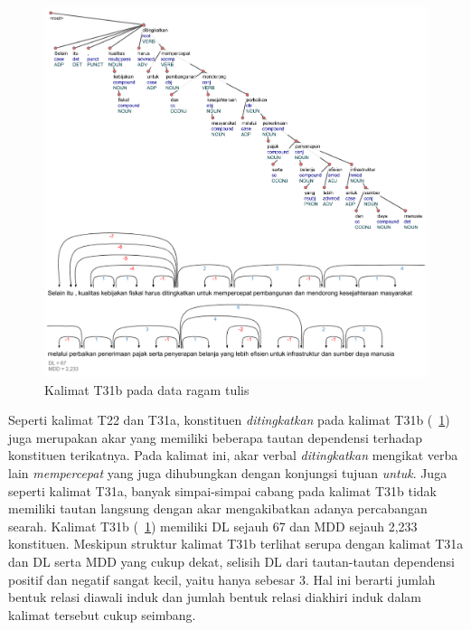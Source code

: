 \begin{figure}
	\centering \includegraphics[width=1
	\textwidth] {pics/ts2081.jpg} 
	\caption{Kalimat T31b pada data ragam tulis} 
	\label{fig:ts2081} 
\end{figure}

Seperti kalimat T22 dan T31a, konstituen \textit{ditingkatkan} pada kalimat T31b (\pic~\ref{fig:ts2081}) juga merupakan akar yang memiliki beberapa tautan dependensi terhadap konstituen terikatnya. Pada kalimat ini, akar verbal \textit{ditingkatkan} mengikat verba lain \textit{mempercepat} yang juga dihubungkan dengan konjungsi tujuan \textit{untuk}. Juga seperti kalimat T31a, banyak simpai-simpai cabang pada kalimat T31b tidak memiliki tautan langsung dengan akar mengakibatkan adanya percabangan searah. Kalimat T31b (\pic~\ref{fig:ts2081}) memiliki DL sejauh 67 dan MDD sejauh 2,233 konstituen. Meskipun struktur kalimat T31b terlihat serupa dengan kalimat T31a dan DL serta MDD yang cukup dekat, selisih DL dari tautan-tautan dependensi positif dan negatif sangat kecil, yaitu hanya sebesar 3. Hal ini berarti jumlah bentuk relasi diawali induk dan jumlah bentuk relasi diakhiri induk dalam kalimat tersebut cukup seimbang. 

